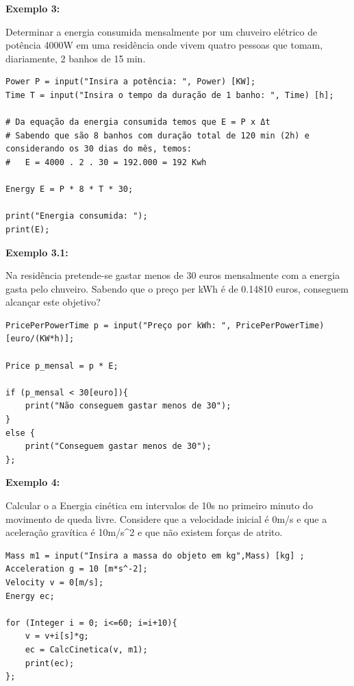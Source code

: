 \documentclass[10pt,portuguese]{article}
\begin{document}
\par \textbf{Exemplo 3:}

\par Determinar a energia consumida mensalmente por um chuveiro elétrico de potência 4000W em uma residência onde vivem quatro pessoas que tomam, diariamente, 2 banhos de 15 min.

\begin{lstlisting}[numbers=none]
Power P = input("Insira a potência: ", Power) [KW];
Time T = input("Insira o tempo da duração de 1 banho: ", Time) [h];

# Da equação da energia consumida temos que E = P x Δt
# Sabendo que são 8 banhos com duração total de 120 min (2h) e considerando os 30 dias do mês, temos:
#   E = 4000 . 2 . 30 = 192.000 = 192 Kwh

Energy E = P * 8 * T * 30;

print("Energia consumida: ");
print(E);
\end{lstlisting}

\par \textbf{Exemplo 3.1:}

\par Na residência pretende-se gastar menos de 30 euros mensalmente com a energia gasta pelo chuveiro. Sabendo que o preço per kWh é de 0.14810 euros, conseguem alcançar este objetivo?

\begin{lstlisting}[numbers=none]
PricePerPowerTime p = input("Preço por kWh: ", PricePerPowerTime) [euro/(KW*h)];

Price p_mensal = p * E;

if (p_mensal < 30[euro]){
    print("Não conseguem gastar menos de 30");
}
else {
    print("Conseguem gastar menos de 30");
};
\end{lstlisting}

\clearpage

\par \textbf{Exemplo 4:}

\par Calcular o a Energia cinética em intervalos de 10s no primeiro minuto do movimento de queda livre. Considere que a velocidade inicial é 0m/s e que a aceleração gravítica é 10m/s\string^2 e que não existem forças de atrito.

\begin{lstlisting}[numbers=none]
Mass m1 = input("Insira a massa do objeto em kg",Mass) [kg] ;
Acceleration g = 10 [m*s^-2];
Velocity v = 0[m/s];
Energy ec;

for (Integer i = 0; i<=60; i=i+10){
    v = v+i[s]*g;
    ec = CalcCinetica(v, m1);
    print(ec); 
};
\end{lstlisting}
\end{document}
